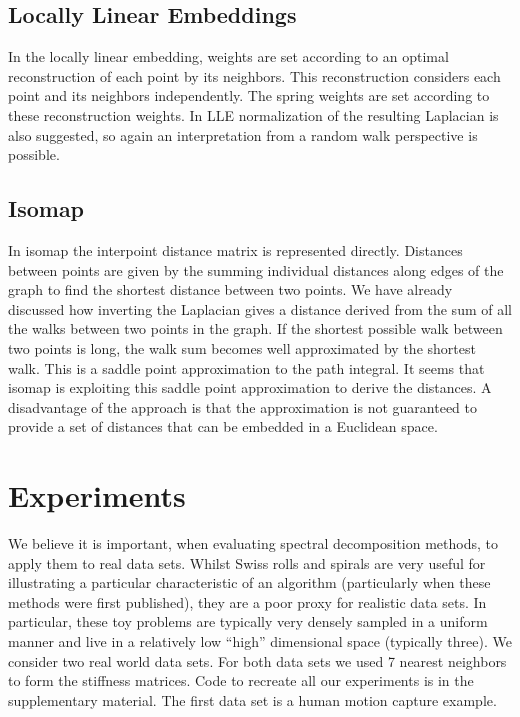 \subsection{Locally Linear Embeddings}

In the locally linear embedding, weights are set according to an
optimal reconstruction of each point by its neighbors. This
reconstruction considers each point and its neighbors
independently. The spring weights are set according to these
reconstruction weights. In LLE normalization of the resulting
Laplacian is also suggested, so again an interpretation from a random
walk perspective is possible.

\subsection{Isomap}

In isomap the interpoint distance matrix is represented
directly. Distances between points are given by the summing individual
distances along edges of the graph to find the shortest distance
between two points. We have already discussed how inverting the
Laplacian gives a distance derived from the sum of all the walks
between two points in the graph. If the shortest possible walk between
two points is long, the walk sum becomes well approximated by the
shortest walk. This is a saddle point approximation to the 
path integral. It seems that isomap is exploiting
this saddle point approximation to derive the distances. A disadvantage of
the approach is that the approximation is not guaranteed to provide a
set of distances that can be embedded in a Euclidean space.

\section{Experiments}

We believe it is important, when evaluating spectral decomposition
methods, to apply them to real data sets. Whilst Swiss rolls and
spirals are very useful for illustrating a particular characteristic
of an algorithm (particularly when these methods were first
published), they are a poor proxy for realistic data sets. In
particular, these toy problems are typically very densely sampled in a
uniform manner and live in a relatively low ``high'' dimensional space
(typically three). We consider two real world data sets. For both data
sets we used 7 nearest neighbors to form the stiffness matrices. Code
to recreate all our experiments is in the supplementary
material. The first data set is a human motion capture example.

